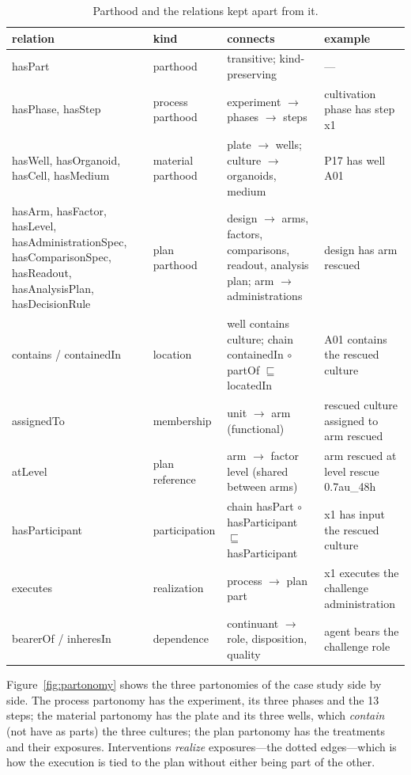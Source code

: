 \documentclass[10pt,a4paper]{article}
\begin{document}
\begin{table}[tbp]\centering\footnotesize
\caption{Parthood and the relations kept apart from it.}\label{tab:partonomy}
\begin{tabularx}{\linewidth}{@{}p{3.9cm}p{2.2cm}Xp{3.3cm}@{}}\toprule relation & kind & connects & example \\ \midrule
hasPart & parthood & transitive; kind-preserving & — \\
hasPhase, hasStep & process parthood & experiment $\to$ phases $\to$ steps & cultivation phase has step x1 \\
hasWell, hasOrganoid, hasCell, hasMedium & material parthood & plate $\to$ wells; culture $\to$ organoids, medium & P17 has well A01 \\
hasArm, hasFactor, hasLevel, hasAdministrationSpec, hasComparisonSpec, hasReadout, hasAnalysisPlan, hasDecisionRule & plan parthood & design $\to$ arms, factors, comparisons, readout, analysis plan; arm $\to$ administrations & design has arm rescued \\
contains / containedIn & location & well contains culture; chain containedIn $\circ$ partOf $\sqsubseteq$ locatedIn & A01 contains the rescued culture \\
assignedTo & membership & unit $\to$ arm (functional) & rescued culture assigned to arm rescued \\
atLevel & plan reference & arm $\to$ factor level (shared between arms) & arm rescued at level rescue 0.7au\_\allowbreak{}48h \\
hasParticipant & participation & chain hasPart $\circ$ hasParticipant $\sqsubseteq$ hasParticipant & x1 has input the rescued culture \\
executes & realization & process $\to$ plan part & x1 executes the challenge administration \\
bearerOf / inheresIn & dependence & continuant $\to$ role, disposition, quality & agent bears the challenge role \\
\bottomrule\end{tabularx}\end{table}


Figure~\ref{fig:partonomy} shows the three partonomies of the case study side by side. The process partonomy has the
experiment, its three phases and the 13 steps; the material partonomy has the plate and its three wells, which
\emph{contain} (not have as parts) the three cultures; the plan partonomy has the treatments and their exposures.
Interventions \emph{realize} exposures---the dotted edges---which is how the execution is tied to the plan without
either being part of the other.
\end{document}
